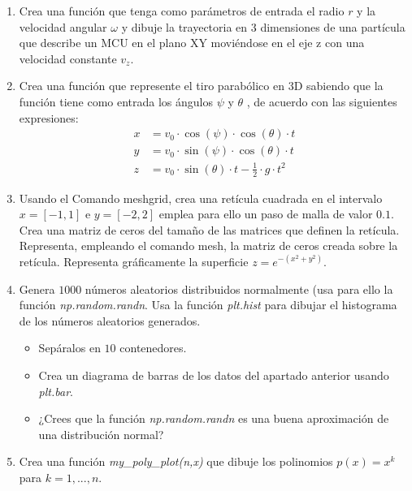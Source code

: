 \begin{enumerate}
\item Crea una función que tenga como parámetros de entrada el radio $r$ y
la velocidad angular $\omega$ y dibuje la trayectoria en 3 dimensiones de una partícula que describe un MCU en el plano XY moviéndose en el eje z con una velocidad constante $v_z$.

\item Crea una función que represente el tiro parabólico en 3D sabiendo
que la función tiene como entrada los ángulos $\psi$ y $\theta$ , de acuerdo con las siguientes expresiones:
\begin{align*}
    x&=v_0 \cdot \cos(\psi)\cdot \cos(\theta) \cdot t \\
    y&=v_0 \cdot \sin(\psi)\cdot \cos(\theta) \cdot t  \\
    z&=v_0 \cdot \sin(\theta) \cdot t- \frac{1}{2} \cdot g \cdot t^2
\end{align*}

\item Usando el Comando meshgrid, crea una retícula cuadrada en el intervalo $x = [-1, 1]$ e  $y = [-2, 2]$ emplea para ello un paso de malla de valor $0.1$. Crea una matriz de ceros del tamaño de las matrices que definen la retícula. Representa, empleando el comando mesh, la matriz de ceros
creada sobre la retícula. Representa gráficamente la superficie $z = e^{-(x^2+y^2)}$. 

\item Genera $1000$ números aleatorios distribuidos normalmente (usa para ello la función \emph{np.random.randn}. Usa la función \emph{plt.hist} para dibujar el histograma de los números aleatorios generados. 
\begin{itemize}
    \item Sepáralos en $10$ contenedores.
    \item Crea un diagrama de barras de los datos del apartado anterior usando  \emph{plt.bar}.
    \item ¿Crees que la función \emph{np.random.randn} es una buena aproximación de una distribución normal?
\end{itemize}

\item  Crea una función \emph{my\_poly\_plot(n,x)} que dibuje los polinomios $p(x)=x^k$ para $k=1,...,n$.


\end{enumerate}
